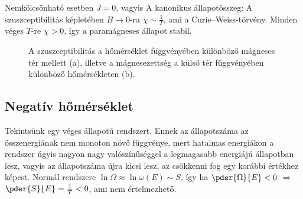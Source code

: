    Nemkölcsönható esetben $J=0$, vagyis
   A kanonikus állapotösszeg:
   A szuszceptibilitás képletében $B\to 0$-ra $\chi\sim\frac{1}{T}$, ami a Curie--Weiss-törvény.
   Minden véges $T$-re $\chi>0$, így a paramágneses állapot stabil. 
   
   \begin{figure}[ht!]
    \centering
     \hspace{6pt}
    \caption{A szuszceptibilitás a hőmérséklet függvényében különböző mágneses tér mellett (a), illetve a mágnesezettség a külső tér függvényében különböző hőmérsékleten (b).}
   \end{figure}
   
  \subsection{Negatív hőmérséklet}\label{ss:neghom}
   
   Tekintsünk egy véges állapotú rendszert.
   Ennek az állapotszáma az összenergiának nem monoton növő függvénye, mert hatalmas energiákon a rendszer úgyis nagyon nagy valószínűséggel a legmagasabb energiájú állapotban lesz, vagyis az állapotszáma újra kicsi lesz, az csökkenni fog egy korábbi értékhez képest.
   Normál rendszere $\ln\Omega\approx\ln\omega(E)\sim S$, így ha $\pder{\Omega}{E}<0$ $\Rightarrow$ $\pder{S}{E}=\frac{1}{T}<0$, ami nem értelmezhető.
   
